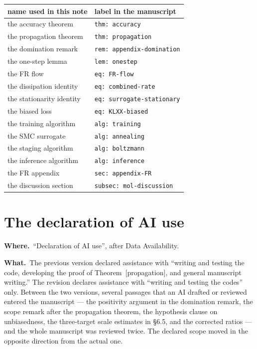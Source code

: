 \documentclass[11pt]{article}
\newcommand{\lab}[1]{\texttt{\small #1}}
\newcommand{\where}[1]{\smallskip\noindent\textbf{Where.}\ #1\par}
\newcommand{\what}[1]{\smallskip\noindent\textbf{What.}\ #1\par}
\begin{document}
\begin{center}
\small
\begin{tabular}{@{}ll@{}}
\toprule
name used in this note & label in the manuscript \\
\midrule
the accuracy theorem & \lab{thm: accuracy} \\
the propagation theorem & \lab{thm: propagation} \\
the domination remark & \lab{rem: appendix-domination} \\
the one-step lemma & \lab{lem: onestep} \\
the FR flow & \lab{eq: FR-flow} \\
the dissipation identity & \lab{eq: combined-rate} \\
the stationarity identity & \lab{eq: surrogate-stationary} \\
the biased loss & \lab{eq: KLXX-biased} \\
the training algorithm & \lab{alg: training} \\
the SMC surrogate & \lab{alg: annealing} \\
the staging algorithm & \lab{alg: boltzmann} \\
the inference algorithm & \lab{alg: inference} \\
the FR appendix & \lab{sec: appendix-FR} \\
the discussion section & \lab{subsec: mol-discussion} \\
\bottomrule
\end{tabular}
\end{center}

\section{The declaration of AI use}
\label{sec:decl}

\where{``Declaration of AI use'', after Data Availability.}

\what{The previous version declared assistance with ``writing and testing the
code, developing the proof of Theorem~[propagation], and general manuscript
writing.'' The revision declares assistance with ``writing and testing the
codes'' only. Between the two versions, several passages that an AI drafted or
reviewed entered the manuscript --- the positivity argument in the domination
remark, the scope remark after the propagation theorem, the hypothesis clause
on unbiasedness, the three-target scale estimates in \S6.5, and the corrected
ratios --- and the whole manuscript was reviewed twice. The declared scope
moved in the opposite direction from the actual one.}
\end{document}
